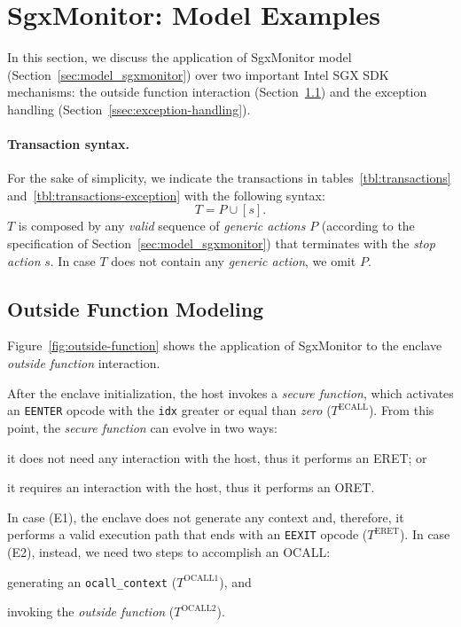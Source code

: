 \section{SgxMonitor: Model Examples}
\label{sec:model-examples_sgxmonitor}

In this section, we discuss the application of SgxMonitor model 
(Section~\ref{sec:model_sgxmonitor}) over two important Intel SGX SDK 
mechanisms:
the outside function interaction (Section~\ref{ssec:ocall-example}) and the 
exception handling (Section~\ref{ssec:exception-handling}).

\paragraph{Transaction syntax.}
For the sake of simplicity, we indicate the transactions in 
tables~\ref{tbl:transactions} and~\ref{tbl:transactions-exception} with the 
following syntax:
$$
T = P \cup [s].
$$
$T$ is composed by any \emph{valid} sequence of \emph{generic actions} $P$ 
(according to the specification of Section~\ref{sec:model_sgxmonitor}) that 
terminates with the \emph{stop action} $s$.
In case $T$ does not contain any \emph{generic action}, we omit $P$.

\subsection{Outside Function Modeling}
\label{ssec:ocall-example}

Figure~\ref{fig:outside-function} shows the application of SgxMonitor to the 
enclave \emph{outside function} interaction.

After the enclave initialization, the host invokes a \emph{secure 
function}, which activates an \texttt{EENTER} opcode with the 
\texttt{idx} greater or equal than \emph{zero} (\ie $T^\text{ECALL}$).
From this point, the \emph{secure function} can evolve in two ways:
\begin{enumerate*}[label=(E\arabic*)]
	\item it does not need any interaction with the host, thus it performs an 
	ERET; or 
	\item it requires an interaction with the host, thus it performs an ORET.
\end{enumerate*}
In case (E1), the enclave does not generate any context and, therefore,
it performs a valid execution path that ends with an 
\texttt{EEXIT} opcode (\ie $T^{\text{ERET}}$).
In case (E2), instead, we need two steps to accomplish an OCALL:
\begin{enumerate*}[label=(\roman*)]
	\item generating an \texttt{ocall\_context} (\ie $T^\text{OCALL1}$), and
	\item invoking the \emph{outside function} (\ie $T^\text{OCALL2}$).
\end{enumerate*}

